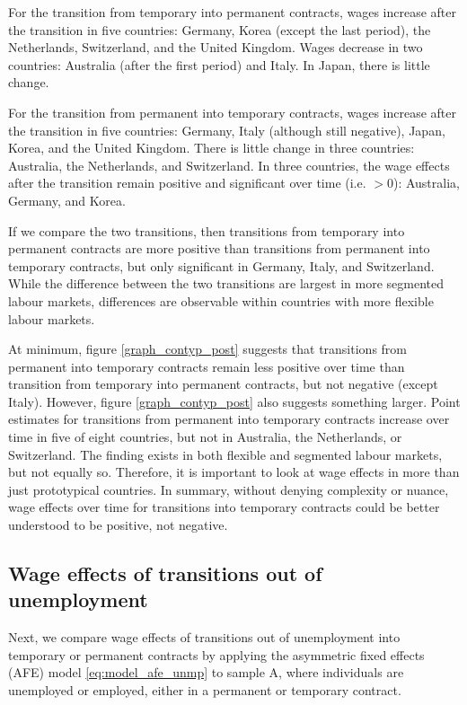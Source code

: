 \documentclass[12pt]{article}
\begin{document}
For the transition from temporary into permanent contracts, wages increase after the transition in five countries: Germany, Korea (except the last period), the Netherlands, Switzerland, and the United Kingdom.  Wages decrease in two countries: Australia (after the first period) and Italy.  In Japan, there is little change.  

For the transition from permanent into temporary contracts, wages increase after the transition in five countries: Germany, Italy (although still negative), Japan, Korea, and the United Kingdom.  There is little change in three countries: Australia, the Netherlands, and Switzerland.  In three countries, the wage effects after the transition remain positive and significant over time (i.e. $>0$): Australia, Germany, and Korea.  

If we compare the two transitions, then transitions from temporary into permanent contracts are more positive than transitions from permanent into temporary contracts, but only significant in Germany, Italy, and Switzerland.   While the difference between the two transitions are largest in more segmented labour markets, differences are observable within countries with more flexible labour markets.  

At minimum, figure \ref{graph_contyp_post} suggests that transitions from permanent into temporary contracts remain less positive over time than transition from temporary into permanent contracts, but not negative (except Italy).  However, figure \ref{graph_contyp_post} also suggests something larger.  Point estimates for transitions from permanent into temporary contracts increase over time in five of eight countries, but not in Australia, the Netherlands, or Switzerland.  The finding exists in both flexible and segmented labour markets, but not equally so.  Therefore, it is important to look at wage effects in more than just prototypical countries.  In summary, without denying complexity or nuance, wage effects over time for transitions into temporary contracts could be better understood to be positive, not negative.  

\subsection{Wage effects of transitions out of unemployment}

Next, we compare wage effects of transitions out of unemployment into temporary or permanent contracts by applying the asymmetric fixed effects (AFE) model \ref{eq:model_afe_unmp} to sample A, where individuals are unemployed or employed, either in a permanent or temporary contract.  
\end{document}
